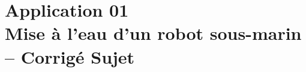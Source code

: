 \chapter*{Application 01 \\ Mise à l'eau d'un robot sous-marin -- \ifprof Corrigé \else Sujet \fi}

%



